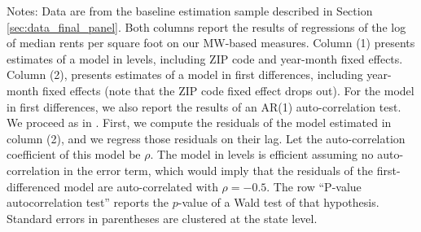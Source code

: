 \begin{table}[hbt!]
    \begin{minipage}{.95\textwidth} \footnotesize
        \vspace{2mm}
        Notes:
        Data are from the baseline estimation sample described in Section 
        \ref{sec:data_final_panel}.
        Both columns report the results of regressions of the log of 
        median rents per square foot on our MW-based measures.
        Column (1) presents estimates of a model in levels, including 
        ZIP code and year-month fixed effects.
        Column (2), presents estimates of a model in first differences, 
        including year-month fixed effects 
        (note that the ZIP code fixed effect drops out).
        For the model in first differences, we also report the results of an 
        AR(1) auto-correlation test.
        We proceed as in \textcite[][Section 10.6.3]{wooldridge2010}.
        First, we compute the residuals of the model estimated in column (2), 
        and we regress those residuals on their lag.
        Let the auto-correlation coefficient of this model be $\rho$.
        The model in levels is efficient assuming no auto-correlation in the 
        error term, which would imply that the residuals of the 
        first-differenced model are auto-correlated with $\rho = -0.5$.
        The row ``P-value autocorrelation test'' reports the $p$-value of 
        a Wald test of that hypothesis.
        Standard errors in parentheses are clustered at the state level.
    \end{minipage}
\end{table}
